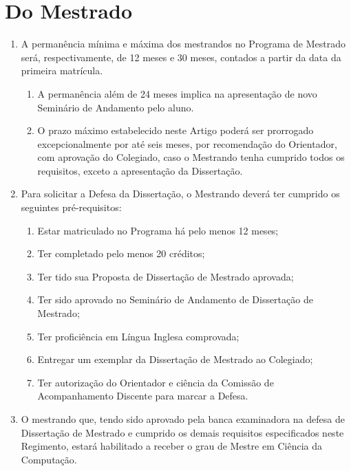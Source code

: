 \documentclass{article}
\newcommand{\grupoMenor}{Colegiado\xspace}
\begin{document}
\section{Do Mestrado}
\begin{enumerate}
	\item A permanência mínima e máxima dos mestrandos no Programa de Mestrado será, respectivamente, de 12 meses e 30 meses, contados a partir da data da primeira matrícula.
	\begin{enumerate}
		\item A permanência além de 24 meses implica na apresentação de novo Seminário de Andamento pelo aluno.	
		\item O prazo máximo estabelecido neste Artigo poderá ser prorrogado excepcionalmente por até seis meses, por recomendação do Orientador, com aprovação do \grupoMenor, caso o Mestrando tenha cumprido todos os requisitos, exceto a apresentação da Dissertação.
	\end{enumerate}

	\item Para solicitar a Defesa da Dissertação, o Mestrando deverá ter cumprido os seguintes pré-requisitos:
	\begin{enumerate}[label=\Roman*]
		\item 	Estar matriculado no Programa há pelo menos 12 meses;
		\item 	Ter completado pelo menos 20 créditos;
		\item 	Ter tido sua Proposta de Dissertação de Mestrado aprovada;
		\item 	Ter sido aprovado no Seminário de Andamento de Dissertação de Mestrado;
		\item 	Ter proficiência em Língua Inglesa comprovada;
		\item 	Entregar um exemplar da Dissertação de Mestrado ao \grupoMenor;
		\item 	Ter autorização do Orientador e ciência da Comissão de Acompanhamento Discente para marcar a Defesa.
	\end{enumerate}

	\item O mestrando que, tendo sido aprovado pela banca examinadora na defesa de Dissertação de Mestrado e cumprido os demais requisitos especificados neste Regimento, estará habilitado a receber o grau de Mestre em Ciência da Computação.

\end{enumerate}
\end{document}
